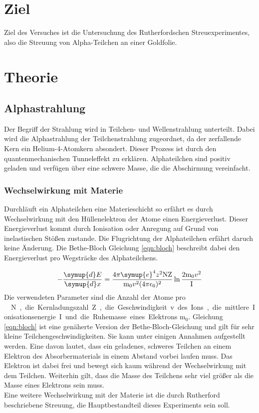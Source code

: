 \section{Ziel}
Ziel des Versuches ist die Untersuchung des Rutherfordschen Streuexperimentes,
also die Streuung von Alpha-Teilchen an einer Goldfolie.

\section{Theorie}
\subsection{Alphastrahlung}
Der Begriff der Strahlung wird in Teilchen- und Wellenstrahlung unterteilt. Dabei
wird die Alphastrahlung der Teilchenstrahlung zugeordnet, da der zerfallende
Kern ein Helium-4-Atomkern absondert. Dieser Prozess ist durch den quantenmechanischen
Tunneleffekt zu erklären. Alphateilchen sind positiv geladen und verfügen über
eine schwere Masse, die die Abschirmung vereinfacht. \cite{potsdam}

\subsubsection{Wechselwirkung mit Materie}
Durchläuft ein Alphateilchen eine Materieschicht so erfährt es durch
Wechselwirkung mit den Hüllenelektron der Atome einen Energieverlust. Dieser
Energieverlust kommt durch Ionisation oder Anregung auf Grund von inelastischen
Stößen zustande. Die Flugrichtung der Alphateilchen erfährt daruch keine
Änderung. Die Bethe-Bloch Gleichung \eqref{eqn:bloch} beschreibt dabei den
Energieverlust pro Wegsträcke des Alphateilchens.

\begin{equation}
- \frac{\symup{d} E}{\symup{d} x} = \frac{4 \pi \symup{e}^4 z^2 \text{N} \text{Z}}
{\text{m}_0 v^2 (4 \pi \epsilon_0)^2} \ln\frac{2 \text{m}_0 v^2}{\text{I}}
\label{eqn:bloch}
\end{equation}
Die verwendeten Parameter sind die Anzahl der Atome pro \SI{}{\centi\meter\cubic}
N , die Kernladungszahl Z, die Geschwindigkeit v des Ions, die mittlere
Ionisationsenergie I und die Ruhemasse eines Elektrons $\text{m}_0$.
Gleichung \eqref{eqn:bloch} ist eine genäherte Version der Bethe-Bloch-Gleichung
und gilt für sehr kleine Teilchengeschwindigkeiten. Sie kann unter einigen
Annahmen aufgestellt werden. Eine davon lautet, dass ein geladenes, schweres
Teilchen an einem Elektron des Absorbermaterials in einem Abstand vorbei laufen
muss. Das Elektron ist dabei frei und bewegt sich kaum während der Wechselwirkung
mit dem Teilchen. Weiterhin gilt, dass die Masse des Teilchens sehr viel größer
als die Masse eines Elektrons sein muss.
\\
Eine weitere Wechselwirkung mit der Materie ist die durch Rutherford beschriebene
Streuung, die Hauptbestandteil dieses Experiments sein soll.

